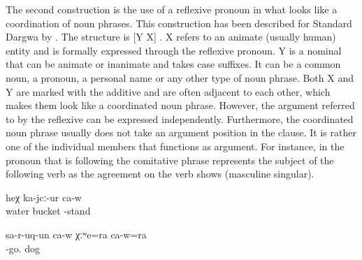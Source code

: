 The second construction is the use of a reflexive pronoun in what looks like a coordination of noun phrases. This construction has been described for Standard Dargwa by \citet{vandenBerg2004}. The structure is [Y X] . X refers to an animate (usually human) entity and is formally expressed through the reflexive pronoun. Y is a nominal that can be animate or inanimate and takes case suffixes. It can be a common noun, a pronoun, a personal name or any other type of noun phrase. Both X and Y are marked with the additive  and are often adjacent to each other, which makes them look like a coordinated noun phrase. However, the argument referred to by the reflexive can be expressed independently. Furthermore, the coordinated noun phrase usually does not take an argument position in the clause. It is rather one of the individual members that functions as argument. For instance, in  the pronoun  that is following the comitative phrase represents the subject of the following verb as the agreement on the verb shows (masculine singular).
%
\begin{exe}
	\ex	\label{ex:‎‎With a bucket of water he is standing}
	\gll	[hin-na	badra=ra	ca-w=ra]	heχ	ka-jcː-ur	ca-w\\
		{\db}water	bucket			-stand	\\
	\glt	{}

	\ex	\label{ex:He ran away with his dog}
	\gll	sa-r-uq-un	ca-w	χːʷe=ra	ca-w=ra\\
		-go.		dog	\\
	\glt	{}
\end{exe}

